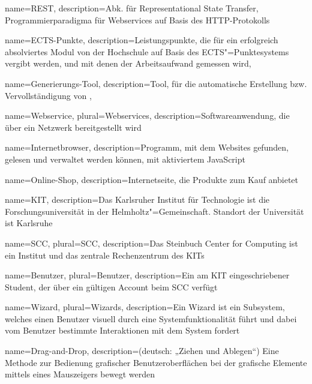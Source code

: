 %
%
%
%
{
	name=REST,
	description={Abk. für Representational State Transfer, Programmierparadigma für \glspl{Webservice} auf Basis des HTTP-Protokolls}
}

{
	name=ECTS-Punkte,
	description={Leistungspunkte, die für ein erfolgreich absolviertes \gls{Modul} von der Hochschule auf Basis des ECTS"=Punktesystems vergibt werden, und mit denen der Arbeitsaufwand gemessen wird},
}

{
	name=Generierungs-Tool,
	description={Tool, für die automatische Erstellung bzw. Vervollständigung von },
}


{
	name=Webservice,
	plural=Webservices,
	description={Softwareanwendung, die über ein Netzwerk bereitgestellt wird}
}

{
	name={Internetbrowser},
	description={Programm, mit dem Websites gefunden, gelesen und verwaltet werden können, mit aktiviertem JavaScript}
}

{
	name={Online-Shop},
	description={Internetseite, die Produkte zum Kauf anbietet}
}

{
	name=KIT,
	description={Das Karlsruher Institut für Technologie ist die Forschungsuniversität in der Helmholtz"=Gemeinschaft. Standort der Universität ist Karlsruhe}
}

{
	name=SCC,
	plural=SCC,
	description={Das Steinbuch Center for Computing ist ein Institut und das zentrale Rechenzentrum des \gls{KIT}s}
}

{
	name=Benutzer,
	plural=Benutzer,
	description={Ein am \gls{KIT} eingeschriebener Student, der über ein gültigen Account beim \gls{SCC} verfügt}
}

{
	name=Wizard,
	plural=Wizards,
	description={Ein Wizard ist ein Subsystem, welches einen \gls{Benutzer} visuell durch eine Systemfunktionalität führt und dabei vom \gls{Benutzer} bestimmte Interaktionen mit dem System fordert}
}

{
	name=Drag-and-Drop,
	description={(deutsch: „Ziehen und Ablegen“) Eine Methode zur Bedienung grafischer Benutzeroberflächen bei der grafische Elemente mittels eines Mauszeigers bewegt werden}
}

